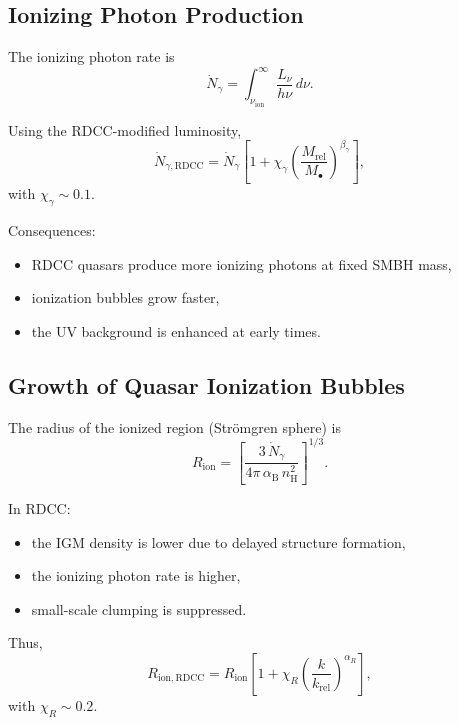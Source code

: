 \documentclass[11pt,a4paper]{article}
\begin{document}
\subsection{Ionizing Photon Production}

The ionizing photon rate is
\begin{equation}
\dot{N}_{\gamma}
=
\int_{\nu_{\mathrm{ion}}}^{\infty}
\frac{L_{\nu}}{h\nu}\,d\nu.
\end{equation}

Using the RDCC-modified luminosity,
\begin{equation}
\dot{N}_{\gamma,\mathrm{RDCC}}
=
\dot{N}_{\gamma}
\left[
1
+
\chi_{\gamma}
\left(
\frac{M_{\mathrm{rel}}}{M_{\bullet}}
\right)^{\beta_{\gamma}}
\right],
\end{equation}
with $\chi_{\gamma} \sim 0.1$.

Consequences:
\begin{itemize}
\item RDCC quasars produce more ionizing photons at fixed SMBH mass,
\item ionization bubbles grow faster,
\item the UV background is enhanced at early times.
\end{itemize}

\subsection{Growth of Quasar Ionization Bubbles}

The radius of the ionized region (Strömgren sphere) is
\begin{equation}
R_{\mathrm{ion}}
=
\left[
\frac{3\,\dot{N}_{\gamma}}
{4\pi\,\alpha_{\mathrm{B}}\,n_{\mathrm{H}}^{2}}
\right]^{1/3}.
\end{equation}

In RDCC:
\begin{itemize}
\item the IGM density is lower due to delayed structure formation,
\item the ionizing photon rate is higher,
\item small-scale clumping is suppressed.
\end{itemize}

Thus,
\begin{equation}
R_{\mathrm{ion,RDCC}}
=
R_{\mathrm{ion}}
\left[
1
+
\chi_{R}
\left(
\frac{k}{k_{\mathrm{rel}}}
\right)^{\alpha_{R}}
\right],
\end{equation}
with $\chi_{R} \sim 0.2$.
\end{document}
